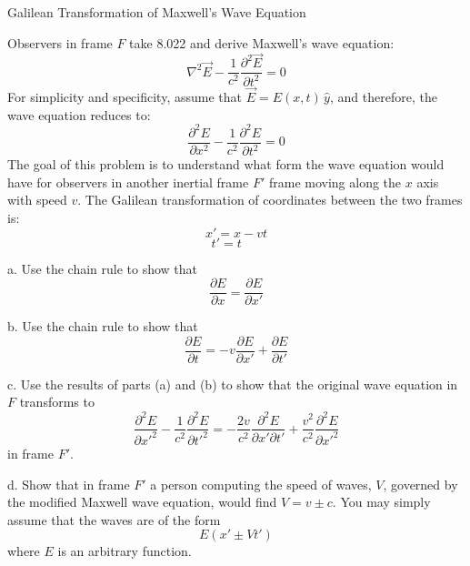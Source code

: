 \documentclass[makesolutionspdf]{esg8022pset}
\begin{document}
\begin{problem}{Galilean Transformation of Maxwell's Wave Equation}
\end{problem}
Observers in frame $F$ take 8.022 and derive Maxwell's wave equation:
$$\nabla^2\vec{E} - \frac{1}{c^2} \frac{\partial^2\vec{E}}{\partial t^2} = 0$$
For simplicity and specificity, assume that $\vec{E} = E(x,t)\, \hat{y}$, and therefore, the wave equation reduces to:
$$\frac{\partial^2E}{\partial x^2} - \frac{1}{c^2} \frac{\partial^2E}{\partial t^2} = 0$$
The goal of this problem is to understand what form the wave equation would have for observers in another inertial frame $F'$ frame moving along the $x$ axis with speed $v$.  The Galilean transformation of coordinates between the two frames is:
$$x' = x - vt$$
$$t' = t~~~~~~~$$


\noindent
a. Use the chain rule to show that
$$\frac{\partial E}{\partial x} = \frac{\partial E}{\partial x'}$$


\noindent
b. Use the chain rule to show that
$$\frac{\partial E}{\partial t} = -v \frac{\partial E}{\partial x'} + \frac{\partial E}{\partial t'}$$


\noindent
c. Use the results of parts (a) and (b) to show that the original wave equation in $F$ transforms to
$$\frac{\partial^2E}{\partial x'^2} - \frac{1}{c^2} \frac{\partial^2E}{\partial t'^2} = -\frac{2v}{c^2} \frac{\partial^2E}{\partial x' \partial t'} + \frac{v^2}{c^2} \frac{\partial^2E}{\partial x'^2}$$
in frame $F'$.


\noindent
d. Show that in frame $F'$ a person computing the speed of waves, $V$, governed by the modified Maxwell wave equation, would find $V = v \pm c$.  You may simply assume that the waves are of the form
$$E(x' \pm Vt')$$
where $E$ is an arbitrary function.
\end{document}
